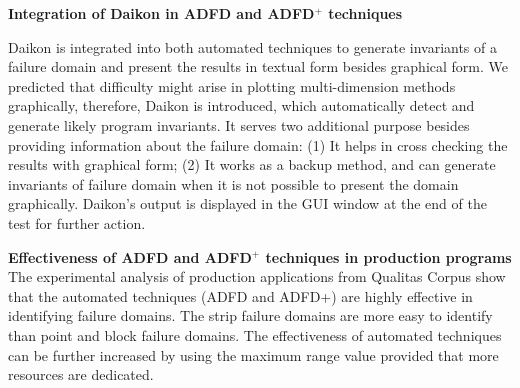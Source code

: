 




\textbf{Integration of Daikon in ADFD and ADFD$^+$ techniques}

Daikon is integrated into both automated techniques to generate invariants of a failure domain and present the results in textual form besides graphical form. We predicted that difficulty might arise in plotting multi-dimension methods graphically, therefore, Daikon is introduced, which automatically detect and generate likely program invariants. It serves two additional purpose besides providing information about the failure domain: (1) It helps in cross checking the results with graphical form; (2) It works as a backup method, and can generate invariants of failure domain when it is not possible to present the domain graphically. Daikon's output is displayed in the GUI window at the end of the test for further action.\\
\clearpage



\textbf{Effectiveness of ADFD and ADFD$^+$ techniques in production programs}
The experimental analysis of production applications from Qualitas Corpus show that the automated techniques (ADFD and ADFD+) are highly effective in identifying failure domains. The strip failure domains are more easy to identify than point and block failure domains. The effectiveness of automated techniques can be further increased by using the maximum range value provided that more resources are dedicated.


